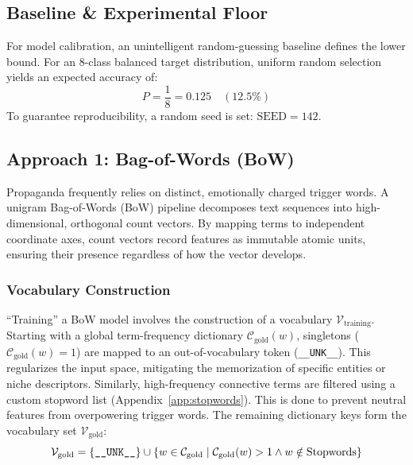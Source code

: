 \documentclass[12pt, a4paper]{article}
\begin{document}
\subsection{Baseline \& Experimental Floor}
\label{subsec:task1_baseline}

For model calibration, an unintelligent random-guessing baseline defines the lower bound. For an 8-class balanced target distribution, uniform random selection yields an expected accuracy of:
\[
P = \frac{1}{8} = 0.125 \quad (12.5\%)
\]
To guarantee reproducibility, a random seed is set: $\text{SEED} = 142$.

\subsection{Approach 1: Bag-of-Words (BoW)}
\label{subsec:bow_approach}

Propaganda frequently relies on distinct, emotionally charged trigger words. A unigram Bag-of-Words (BoW) pipeline decomposes text sequences into high-dimensional, orthogonal count vectors. By mapping terms to independent coordinate axes, count vectors record features as immutable atomic units, ensuring their presence regardless of how the vector develops.

\subsubsection{Vocabulary Construction}
\label{subsubsec:vocab_construction}

``Training'' a BoW model involves the construction of a vocabulary $\mathcal{V}_{\text{training}}$. Starting with a global term-frequency dictionary $\mathcal{C}_{\text{gold}}(w)$, singletons ($\mathcal{C}_{\text{gold}}(w) = 1$) are mapped to an out-of-vocabulary token (\texttt{\_\_UNK\_\_}). This regularizes the input space, mitigating the memorization of specific entities or niche descriptors. Similarly, high-frequency connective terms are filtered using a custom stopword list (Appendix~\ref{app:stopwords}). This is done to prevent neutral features from overpowering trigger words. The remaining dictionary keys form the vocabulary set $\mathcal{V}_{\text{gold}}$:
\[
\mathcal{V}_{\text{gold}} = \{ \text{\texttt{\_\_UNK\_\_}} \} \cup \{ w \in \mathcal{C}_{\text{gold}} \mid \mathcal{C}_{\text{gold}}(w) > 1 \land w \notin \text{Stopwords} \}
\]
\end{document}
